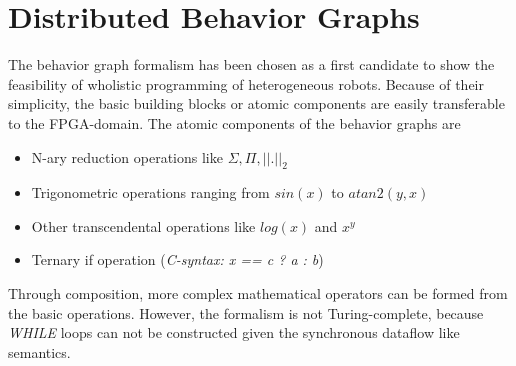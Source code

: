 \documentclass[a4paper,twocolumn]{esapub2005} %
\begin{document}

\section{Distributed Behavior Graphs}
The behavior graph formalism has been chosen as a first candidate to show the feasibility of wholistic programming of heterogeneous robots.
Because of their simplicity, the basic building blocks or atomic components are easily transferable to the FPGA-domain.
The atomic components of the behavior graphs are
\begin{itemize}
    \item N-ary reduction operations like $\Sigma,\Pi,{||.||}_{2}$
    \item Trigonometric operations ranging from $sin(x)$ to $atan2(y,x)$
    \item Other transcendental operations like $log(x)$ and $x^y$
    \item Ternary if operation (\emph{C-syntax: x == c ? a : b})
\end{itemize}
Through composition, more complex mathematical operators can be formed from the basic operations.
However, the formalism is not Turing-complete, because \emph{WHILE} loops can not be constructed given the synchronous dataflow like semantics.
\end{document}

